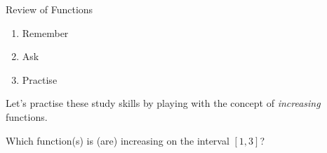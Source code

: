 \documentclass[../main.tex]{subfiles}
\begin{document}
\begin{lesson}{Review of Functions}
  \begin{mdframed}[style=simple]
    \begin{enumerate}
      \item Remember \underline{\hspace{4in}}
      \item Ask \underline{\hspace{4.5in}}
      \item Practise \underline{\hspace{4.2in}} 
    \end{enumerate}
  \end{mdframed}


  \begin{example}
    Let's practise these study skills by playing with the concept of \emph{increasing} functions.

    \faComments{} Which function(s) is (are) increasing on the interval \([1,3]\)?


\end{example}
\end{lesson}
\end{document}
